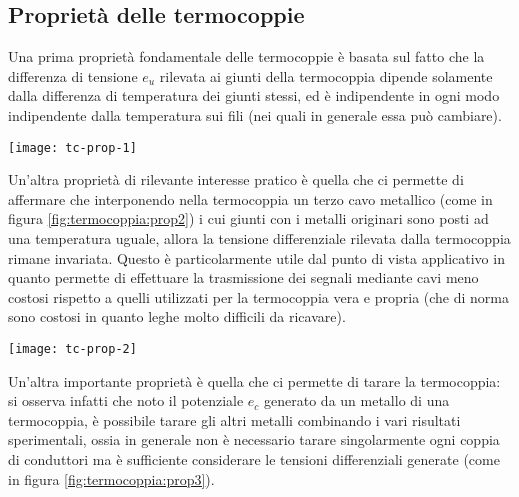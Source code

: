 	\subsection{Proprietà delle termocoppie}
	
		Una prima proprietà fondamentale delle termocoppie è basata sul fatto che la differenza di tensione $e_u$ rilevata ai giunti della termocoppia dipende solamente dalla differenza di temperatura dei giunti stessi, ed è indipendente in ogni modo indipendente dalla temperatura sui fili (nei quali in generale essa può cambiare).
	
		\begin{SCfigure}[2][bht]
			\centering
			\texttt{[image: tc-prop-1]}
			\caption{in una termocoppia la differenza di potenziale $e_u$ rilavata dipende solamente dalla differenza di temperatura dei due giunti.}
		\end{SCfigure}
		
		Un'altra proprietà di rilevante interesse pratico è quella che ci permette di affermare che interponendo nella termocoppia un terzo cavo metallico (come in figura \ref{fig:termocoppia:prop2}) i cui giunti con i metalli originari sono posti ad una temperatura uguale, allora la tensione differenziale rilevata dalla termocoppia rimane invariata. Questo è particolarmente utile dal punto di vista applicativo in quanto permette di effettuare la trasmissione dei segnali mediante cavi meno costosi rispetto a quelli utilizzati per la termocoppia vera e propria (che di norma sono costosi in quanto leghe molto difficili da ricavare).
		
		\begin{SCfigure}[2][bht]
			\centering
			\texttt{[image: tc-prop-2]}
			\caption{interponendo un terzo cavo metallico $c$ all'interno della termocoppia, se le temperature dei due nuovi giunti è uguale allora la differenza di tensione rilevata dalla termocoppia è invariante.}
			\label{fig:termocoppia:prop2}
		\end{SCfigure}
		
		Un'altra importante proprietà è quella che ci permette di tarare la termocoppia: si osserva infatti che noto il potenziale $e_c$ generato da un metallo di una termocoppia, è possibile tarare gli altri metalli combinando i vari risultati sperimentali, ossia in generale non è necessario tarare singolarmente ogni coppia di conduttori ma è sufficiente considerare le tensioni differenziali generate (come in figura \ref{fig:termocoppia:prop3}).
		
